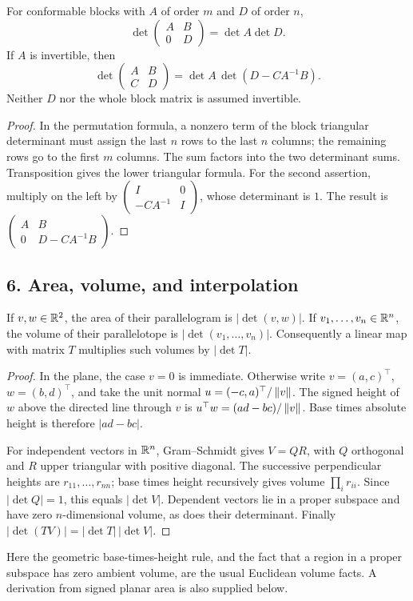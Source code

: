 \begin{proposition}
For conformable blocks with \(A\) of order \(m\) and \(D\) of order \(n\),
\[
 \det\begin{pmatrix}A&B\\0&D\end{pmatrix}=\det A\det D.
\]
If \(A\) is invertible, then
\[
 \det\begin{pmatrix}A&B\\C&D\end{pmatrix}
 =\det A\,\det(D-CA^{-1}B).
\]
Neither \(D\) nor the whole block matrix is assumed invertible.
\end{proposition}
\begin{proof}
In the permutation formula, a nonzero term of the block triangular
determinant must assign the last \(n\) rows to the last \(n\) columns;
the remaining rows go to the first \(m\) columns. The sum factors into the
two determinant sums. Transposition gives the lower triangular formula.
For the second assertion, multiply on the left by
\(\begin{pmatrix}I&0\\-CA^{-1}&I\end{pmatrix}\), whose determinant is \(1\).
The result is
\(\begin{pmatrix}A&B\\0&D-CA^{-1}B\end{pmatrix}\).
\end{proof}

\subsection*{6. Area, volume, and interpolation}
\begin{proposition}
If \(v,w\in\mathbb R^2\), the area of their parallelogram is
\(|\det(v,w)|\). If \(v_1,\ldots,v_n\in\mathbb R^n\), the volume of their
parallelotope is \(|\det(v_1,\ldots,v_n)|\).
Consequently a linear map with matrix \(T\) multiplies such volumes by
\(|\det T|\).
\end{proposition}
\begin{proof}
In the plane, the case \(v=0\) is immediate. Otherwise write
\(v=(a,c)^\top\), \(w=(b,d)^\top\), and take the unit normal
\(u=(-c,a)^\top/\left\lVert v\right\rVert\). The signed height of \(w\) above the directed
line through \(v\) is \(u^\top w=(ad-bc)/\left\lVert v\right\rVert\).
Base times absolute height is therefore \(|ad-bc|\).

For independent vectors in \(\mathbb R^n\), Gram--Schmidt gives \(V=QR\), with
\(Q\) orthogonal and \(R\) upper triangular with positive diagonal.
The successive perpendicular heights are \(r_{11},\ldots,r_{nn}\);
base times height recursively gives volume \(\prod_i r_{ii}\).
Since \(|\det Q|=1\), this equals \(|\det V|\).
Dependent vectors lie in a proper subspace and have zero \(n\)-dimensional
volume, as does their determinant. Finally
\(|\det(TV)|=|\det T|\,|\det V|\).
\end{proof}
Here the geometric base-times-height rule, and the fact that a region in a
proper subspace has zero ambient volume, are the usual Euclidean volume
facts. A derivation from signed planar area is also supplied below.


